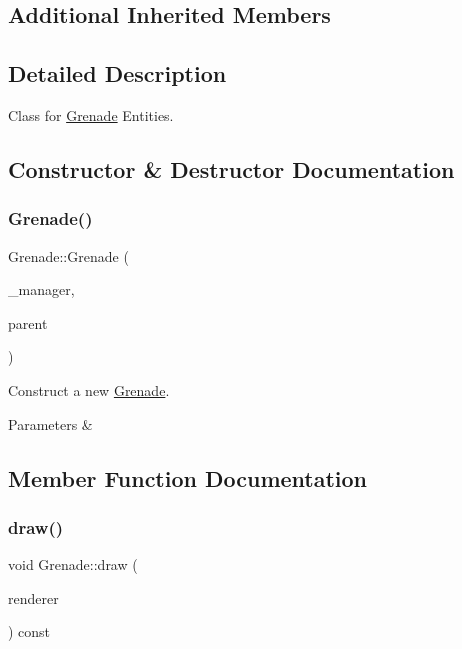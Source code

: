 \subsection*{Additional Inherited Members}


\subsection{Detailed Description}
Class for \mbox{\hyperlink{class_grenade}{Grenade}} Entities. 

\subsection{Constructor \& Destructor Documentation}
\mbox{\label{class_grenade_aaf9345e712698ba13c2a4eaa381cf018}} 
\subsubsection{\texorpdfstring{Grenade()}{Grenade()}}
{\footnotesize\ttfamily Grenade\+::\+Grenade (\begin{DoxyParamCaption}\item[{\mbox{\hyperlink{class_game_manager}{Game\+Manager}} $\ast$}]{\+\_\+manager,  }\item[{\mbox{\hyperlink{class_game_entity}{Game\+Entity}} $\ast$}]{parent }\end{DoxyParamCaption})}



Construct a new \mbox{\hyperlink{class_grenade}{Grenade}}. 


\begin{DoxyParams}{Parameters}
{\em } & \\
\hline
\end{DoxyParams}


\subsection{Member Function Documentation}
\mbox{\label{class_grenade_abfdaf27e6b0182fe6f515cbdd86be1a8}} 
\subsubsection{\texorpdfstring{draw()}{draw()}}
{\footnotesize\ttfamily void Grenade\+::draw (\begin{DoxyParamCaption}\item[{\mbox{\hyperlink{classsf_1_1_render_target}{sf\+::\+Render\+Target}} \&}]{renderer }\end{DoxyParamCaption}) const\hspace{0.3cm}{\ttfamily [virtual]}}



